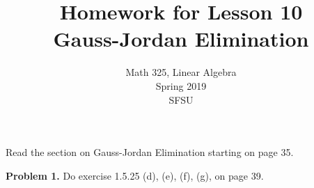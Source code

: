 \documentclass[oneside,12pt]{amsart}
\begin{document}
\title{Homework for Lesson 10 \\ Gauss-Jordan Elimination}
\author{Math 325, Linear Algebra \\ Spring 2019\\ SFSU }
\date{}

\maketitle

Read the section on Gauss-Jordan Elimination starting on page 35.

\bigskip

\textbf{Problem 1.} Do exercise 1.5.25 (d), (e), (f), (g), on page 39.
\end{document}
